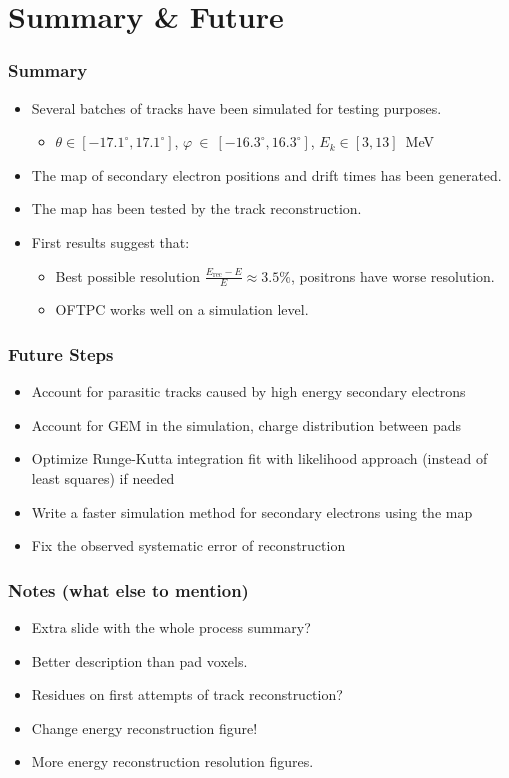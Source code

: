 \documentclass{beamer}
\begin{document}
	
	\section{Summary \& Future}	
	\begin{frame}
		\frametitle{Summary}
		\begin{itemize}
			\item Several batches of tracks have been simulated for testing purposes.
			\begin{itemize}
				\item $\theta\in[-17.1^\circ,17.1^\circ]$, $\varphi~\in~[-16.3^\circ,16.3^\circ]$, $ E_k \in [3,13] $~MeV
			\end{itemize}
			\item The map of secondary electron positions and drift times has been generated.
			\item The map has been tested by the track reconstruction.
			\item First results suggest that:
			\begin{itemize}
				\item Best possible resolution $\frac{E_\text{rec}-E}{E} \approx 3.5\%$, positrons have worse resolution.
				\item OFTPC works well on a simulation level.
			\end{itemize}
		\end{itemize}
	\end{frame}
	\begin{frame}
		\frametitle{Future Steps}
		\begin{itemize}
			\item Account for parasitic tracks caused by high energy secondary electrons
			\item Account for GEM in the simulation, charge distribution between pads
			\item Optimize Runge-Kutta integration fit with likelihood approach (instead of least squares) if needed
			\item Write a faster simulation method for secondary electrons using the map
			\item Fix the observed systematic error of reconstruction
		\end{itemize}
	\end{frame}
	\begin{frame}
		\frametitle{Notes (what else to mention)}
		\begin{itemize}
			\item Extra slide with the whole process summary?
			\item Better description than pad voxels.
			\item Residues on first attempts of track reconstruction?
			\item Change energy reconstruction figure!
			\item More energy reconstruction resolution figures.
		\end{itemize}
	\end{frame}
	
\end{document}
